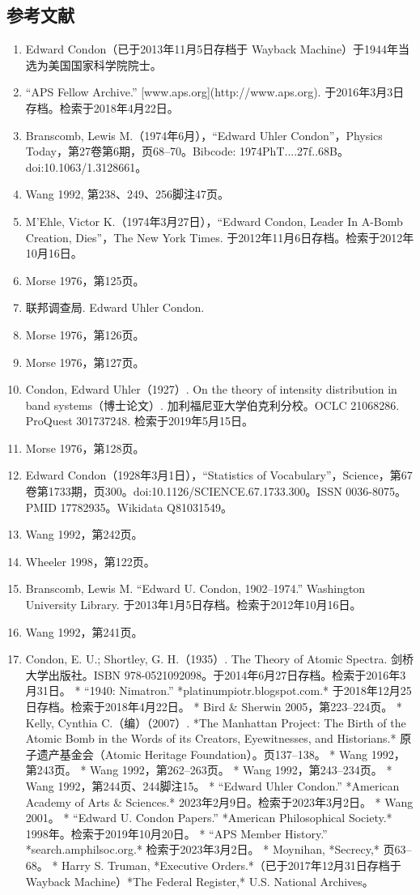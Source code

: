 \subsection{参考文献}
\begin{enumerate}
\item Edward Condon（已于2013年11月5日存档于 Wayback Machine）于1944年当选为美国国家科学院院士。
\item “APS Fellow Archive.” [www.aps.org](http://www.aps.org). 于2016年3月3日存档。检索于2018年4月22日。
\item Branscomb, Lewis M.（1974年6月），“Edward Uhler Condon”，Physics Today，第27卷第6期，页68–70。Bibcode: 1974PhT....27f..68B。doi:10.1063/1.3128661。
\item Wang 1992, 第238、249、256脚注47页。
\item M’Ehle, Victor K.（1974年3月27日），“Edward Condon, Leader In A-Bomb Creation, Dies”，The New York Times. 于2012年11月6日存档。检索于2012年10月16日。
\item Morse 1976，第125页。
\item 联邦调查局. Edward Uhler Condon.
\item Morse 1976，第126页。
\item Morse 1976，第127页。
\item Condon, Edward Uhler（1927）. On the theory of intensity distribution in band systems（博士论文）. 加利福尼亚大学伯克利分校。OCLC 21068286. ProQuest 301737248. 检索于2019年5月15日。
\item Morse 1976，第128页。
\item Edward Condon（1928年3月1日），“Statistics of Vocabulary”，Science，第67卷第1733期，页300。doi:10.1126/SCIENCE.67.1733.300。ISSN 0036-8075。PMID 17782935。Wikidata Q81031549。
\item Wang 1992，第242页。
\item Wheeler 1998，第122页。
\item Branscomb, Lewis M. “Edward U. Condon, 1902–1974.” Washington University Library. 于2013年1月5日存档。检索于2012年10月16日。
\item Wang 1992，第241页。
\item Condon, E. U.; Shortley, G. H.（1935）. The Theory of Atomic Spectra. 剑桥大学出版社。ISBN 978-0521092098。于2014年6月27日存档。检索于2016年3月31日。
* “1940: Nimatron.” *platinumpiotr.blogspot.com.* 于2018年12月25日存档。检索于2018年4月22日。
* Bird & Sherwin 2005，第223–224页。
* Kelly, Cynthia C.（编）（2007）. *The Manhattan Project: The Birth of the Atomic Bomb in the Words of its Creators, Eyewitnesses, and Historians.* 原子遗产基金会（Atomic Heritage Foundation）。页137–138。
* Wang 1992，第243页。
* Wang 1992，第262–263页。
* Wang 1992，第243–234页。
* Wang 1992，第244页、244脚注15。
* “Edward Uhler Condon.” *American Academy of Arts & Sciences.* 2023年2月9日。检索于2023年3月2日。
* Wang 2001。
* “Edward U. Condon Papers.” *American Philosophical Society.* 1998年。检索于2019年10月20日。
* “APS Member History.” *search.amphilsoc.org.* 检索于2023年3月2日。
* Moynihan, *Secrecy,* 页63–68。
* Harry S. Truman, *Executive Orders.*（已于2017年12月31日存档于 Wayback Machine）*The Federal Register,* U.S. National Archives。

\end{enumerate}